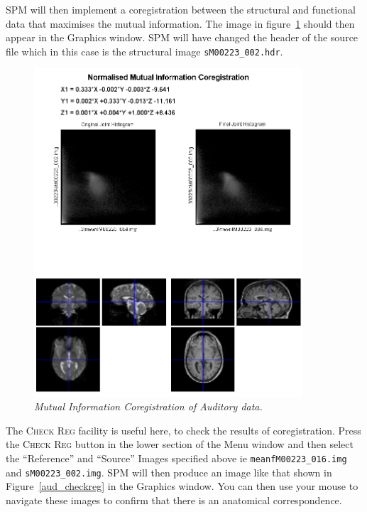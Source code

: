 SPM will then implement a coregistration between the structural and functional data that maximises the mutual information. The image in figure~\ref{aud_coreg} should then appear in the Graphics window. SPM will have changed the header of the source file which in this case is the structural image \texttt{sM00223\_002.hdr}.
\begin{figure}
\begin{center}
\includegraphics[width=100mm]{auditory/coreg}
\caption{\em Mutual Information Coregistration of Auditory data.\label{aud_coreg}}
\end{center}
\end{figure}

The \textsc{Check Reg} facility is useful here, to check the results of coregistration. Press the \textsc{Check Reg} button in the lower section of the Menu window and then select the ``Reference'' and ``Source'' Images specified above ie \texttt{meanfM00223\_016.img} and \texttt{sM00223\_002.img}. SPM will then produce an image like that shown in Figure~\ref{aud_checkreg} in the Graphics window. You can then use your mouse to navigate these images to confirm that there is an anatomical correspondence.


